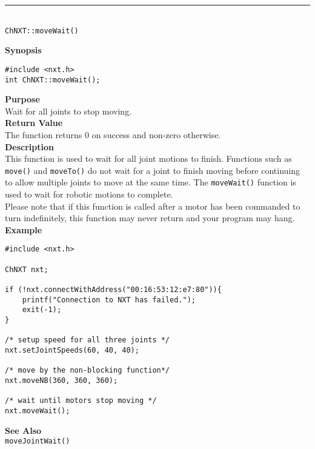 \noindent
\vspace{5pt}
\rule{4.5in}{0.015in}\\
\noindent
{\LARGE \texttt{ChNXT::moveWait()}}\\
{}

\noindent
{\bf Synopsis}
\begin{lstlisting}
#include <nxt.h>
int ChNXT::moveWait();
\end{lstlisting}

\noindent
{\bf Purpose}\\
Wait for all joints to stop moving.\\

\noindent
{\bf Return Value}\\
The function returns 0 on success and non-zero otherwise.\\

\noindent
{\bf Description}\\
This function is used to wait for all joint motions to finish. Functions such as
\texttt{move()} and \texttt{moveTo()} do not wait for a joint to finish
moving before continuing to allow multiple joints to move at the same time. The
\texttt{moveWait()} function is used to wait for robotic motions to complete.\\

\noindent
Please note that if this function is called after a motor has been commanded to
turn indefinitely, this function may never return and your program may hang.\\

\noindent
{\bf Example}
\begin{lstlisting}
#include <nxt.h> 

ChNXT nxt;

if (!nxt.connectWithAddress("00:16:53:12:e7:80")){
    printf("Connection to NXT has failed.");
    exit(-1);
}
 
/* setup speed for all three joints */
nxt.setJointSpeeds(60, 40, 40);

/* move by the non-blocking function*/
nxt.moveNB(360, 360, 360);

/* wait until motors stop moving */
nxt.moveWait();
\end{lstlisting}


\noindent
{\bf See Also}\\
\texttt{moveJointWait()}

